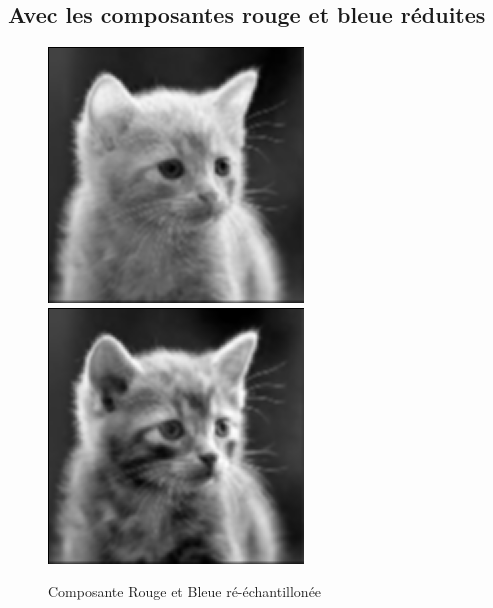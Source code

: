 \documentclass{article}
\begin{document}
\subsection{Avec les composantes rouge et bleue réduites}
\begin{figure}[h]
\centerline{\includegraphics[scale=0.7]{./rendus/ResizeRed.png} \includegraphics[scale=0.7]{./rendus/ResizeBlue.png} }
\caption{Composante Rouge et Bleue ré-échantillonée }
\end{figure}
\end{document}
